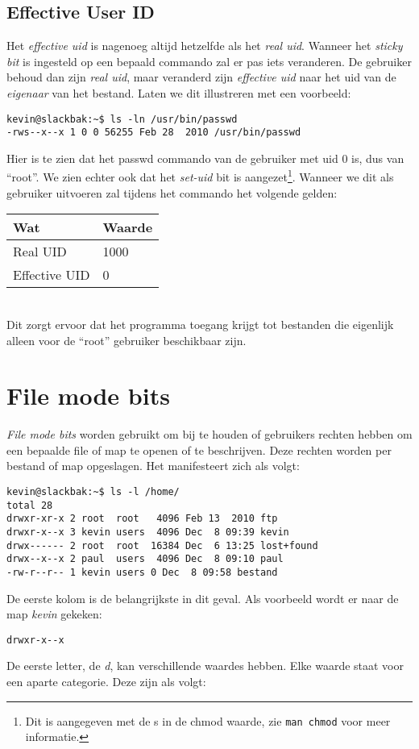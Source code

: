 \subsection{Effective User ID}
Het \emph{effective uid} is nagenoeg altijd hetzelfde als het \emph{real uid}. Wanneer het \emph{sticky bit} is ingesteld op een bepaald commando zal er pas iets veranderen. De gebruiker behoud dan zijn \emph{real uid}, maar veranderd zijn \emph{effective uid} naar het uid van de \emph{eigenaar} van het bestand. Laten we dit illustreren met een voorbeeld:
\begin{lstlisting}
kevin@slackbak:~$ ls -ln /usr/bin/passwd
-rws--x--x 1 0 0 56255 Feb 28  2010 /usr/bin/passwd
\end{lstlisting}%
Hier is te zien dat het passwd commando van de gebruiker met uid 0 is, dus van ``root''. We zien echter ook dat het \emph{set-uid} bit is aangezet\footnote{Dit is aangegeven met de s in de chmod waarde, zie \texttt{man chmod} voor meer informatie.}. Wanneer we dit als gebruiker uitvoeren zal tijdens het commando het volgende gelden:
\begin{tabular}[t]{ll}
  \hline
  Wat & Waarde\\
  \hline
  Real UID & 1000\\
  Effective UID & 0\\
\end{tabular}\\
Dit zorgt ervoor dat het programma toegang krijgt tot bestanden die eigenlijk alleen voor de ``root'' gebruiker beschikbaar zijn. 

\section{File mode bits}
\emph{File mode bits} worden gebruikt om bij te houden of gebruikers rechten hebben om een bepaalde file of map te openen of te beschrijven. Deze rechten worden per bestand of map opgeslagen. Het manifesteert zich als volgt:
\begin{lstlisting}
kevin@slackbak:~$ ls -l /home/
total 28
drwxr-xr-x 2 root  root   4096 Feb 13  2010 ftp
drwxr-x--x 3 kevin users  4096 Dec  8 09:39 kevin
drwx------ 2 root  root  16384 Dec  6 13:25 lost+found
drwx--x--x 2 paul  users  4096 Dec  8 09:10 paul
-rw-r--r-- 1 kevin users 0 Dec  8 09:58 bestand
\end{lstlisting}%
De eerste kolom is de belangrijkste in dit geval. Als voorbeeld wordt er naar de map \emph{kevin} gekeken:
\begin{lstlisting}
drwxr-x--x
\end{lstlisting}
De eerste letter, de \emph{d}, kan verschillende waardes hebben. Elke waarde staat voor een aparte categorie. Deze zijn als volgt:

